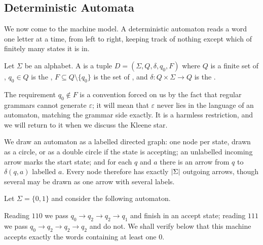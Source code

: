 \documentclass[a4paper]{scrartcl}
\newcommand{\eps}{\varepsilon}
\newcommand{\initarr}[2]{\draw[tra] ($(#1)+#2$) -- (#1);}
\begin{document}
\subsection{Deterministic Automata}

We now come to the machine model. A deterministic automaton reads a word one letter at a time, from left to right, keeping track of nothing except which of finitely many states it is in.

\begin{definition}
	Let $\Sigma$ be an alphabet. A  is a tuple $D = (\Sigma, Q, \delta, q_0, F)$ where $Q$ is a finite set of , $q_0 \in Q$ is the , $F \subseteq Q \setminus \{q_0\}$ is the set of , and $\delta \colon Q \times \Sigma \to Q$ is the .
\end{definition}

The requirement $q_0 \notin F$ is a convention forced on us by the fact that regular grammars cannot generate $\eps$; it will mean that $\eps$ never lies in the language of an automaton, matching the grammar side exactly. It is a harmless restriction, and we will return to it when we discuss the Kleene star.

We draw an automaton as a labelled directed graph: one node per state, drawn as a circle, or as a double circle if the state is accepting; an unlabelled incoming arrow marks the start state; and for each $q$ and $a$ there is an arrow from $q$ to $\delta(q,a)$ labelled $a$. Every node therefore has exactly $\lvert\Sigma\rvert$ outgoing arrows, though several may be drawn as one arrow with several labels.

\begin{example}\label{ex:atleastonezero}
	Let $\Sigma = \{0,1\}$ and consider the following automaton.
	\begin{center}
	\end{center}
	Reading $110$ we pass $q_0 \to q_2 \to q_2 \to q_1$ and finish in an accept state; reading $111$ we pass $q_0 \to q_2 \to q_2 \to q_2$ and do not. We shall verify below that this machine accepts exactly the words containing at least one $0$.
\end{example}
\end{document}
